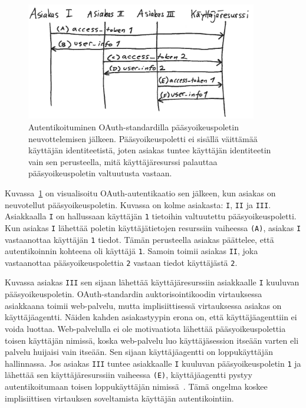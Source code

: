 \documentclass[finnish,gradu]{tktltiki}
\begin{document}
  \begin{figure}
    \centering
    \includegraphics[width=0.9\textwidth]{images/oauth_implisiittinen_porblem.jpg}
    \caption[Autentikoituminen OAuth-standardilla]{Autentikoituminen OAuth-standardilla pääsyoikeuspoletin neuvottelemisen jälkeen. Pääsyoikeuspoletti ei sisällä väittämää käyttäjän identiteetistä, joten asiakas tuntee käyttäjän identiteetin vain sen perusteella, mitä käyttäjäresurssi palauttaa pääsyoikeuspoletin valtuutusta vastaan.}
    \label{fig:oauth_implicit_problem}
  \end{figure}

  Kuvassa~\ref{fig:oauth_implicit_problem} on visualisoitu OAuth-autentikaatio sen jälkeen, kun asiakas on neuvotellut pääsyoikeuspoletin. Kuvassa on kolme asiakasta: \verb!I!, \verb!II! ja \verb!III!. Asiakkaalla \verb!I! on hallussaan käyttäjän \verb!1! tietoihin valtuutettu pääsyoikeuspoletti. Kun asiakas \verb!I! lähettää poletin käyttäjätietojen resurssiin vaiheessa \verb!(A)!, asiakas \verb!I! vastaanottaa käyttäjän \verb!1! tiedot. Tämän perusteella asiakas päättelee, että autentikoinnin kohteena oli käyttäjä \verb!1!. Samoin toimii asiakas \verb!II!, joka vastaanottaa pääsyoikeuspolettia \verb!2! vastaan tiedot käyttäjästä \verb!2!.

  Kuvassa asiakas \verb!III! sen sijaan lähettää käyttäjäresurssiin asiakkaalle \verb!I! kuuluvan pääsyoikeuspoletin. OAuth-standardin auktorisointikoodin virtauksessa asiakkaana toimii web-palvelu, mutta implisiittisessä virtauksessa asiakas on käyttäjäagentti. Näiden kahden asiakastyypin erona on, että käyttäjäagenttiin ei voida luottaa. Web-palvelulla ei ole motivaatiota lähettää pääsyoikeuspolettia toisen käyttäjän nimissä, koska web-palvelu luo käyttäjäsession itseään varten eli palvelu huijaisi vain itseään. Sen sijaan käyttäjäagentti on loppukäyttäjän hallinnassa. Jos asiakas \verb!III! tuntee asiakkaalle \verb!I! kuuluvan pääsyoikeuspoletin \verb!1! ja lähettää sen käyttäjäresurssiin vaiheessa \verb!(E)!, käyttäjäagentti pystyy autentikoitumaan toisen loppukäyttäjän nimissä~\cite{bradley_oauth_implicit_flow_vulnerability_2012}. Tämä ongelma koskee implisiittisen virtauksen soveltamista käyttäjän autentikointiin.
\end{document}
